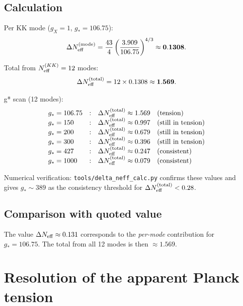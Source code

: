 \documentclass[12pt,a4paper]{article}
\begin{document}
\subsection{Calculation}

Per KK mode ($g_X = 1$, $g_*=106.75$):
\[
  \Delta N_{\rm eff}^{(\rm mode)}
  = \frac{43}{4}\left(\frac{3.909}{106.75}\right)^{4/3}
  \approx \mathbf{0.1308}.
\]

Total from $N_{\rm eff}^{(KK)} = 12$ modes:
\[
  \Delta N_{\rm eff}^{(\rm total)} = 12 \times 0.1308 \approx \mathbf{1.569}.
\]

g* scan (12 modes):
\[
\begin{array}{lcl}
g_*=106.75 &:& \Delta N_{\rm eff}^{(\rm total)}\approx 1.569 \quad (\text{tension}) \\
g_*=150 &:& \Delta N_{\rm eff}^{(\rm total)}\approx 0.997 \quad (\text{still\ in\ tension}) \\
g_*=200 &:& \Delta N_{\rm eff}^{(\rm total)}\approx 0.679 \quad (\text{still\ in\ tension}) \\
g_*=300 &:& \Delta N_{\rm eff}^{(\rm total)}\approx 0.396 \quad (\text{still\ in\ tension}) \\
g_*=427 &:& \Delta N_{\rm eff}^{(\rm total)}\approx 0.247 \quad (\text{consistent}) \\
g_*=1000 &:& \Delta N_{\rm eff}^{(\rm total)}\approx 0.079 \quad (\text{consistent})
\end{array}
\]

Numerical verification: \texttt{tools/delta\_neff\_calc.py} confirms these values
and gives $g_*\sim 389$ as the consistency threshold for
$\Delta N_{\rm eff}^{(\rm total)}<0.28$.

\subsection{Comparison with quoted value}

The value $\Delta N_{\rm eff} \approx 0.131$ corresponds to the \emph{per-mode}
contribution for $g_*=106.75$. The total from all 12 modes is then
$\approx 1.569$.

\section{Resolution of the apparent Planck tension}
\label{sec:gstar_prop}
\end{document}
